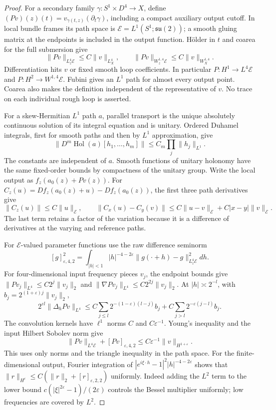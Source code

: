 \documentclass[11pt]{amsart}
\theoremstyle{definition}
\theoremstyle{remark}
\theoremstyle{plain}
\begin{document}
\begin{proof}
For a secondary family $\gamma:S^1\times D^4\to X$, define
$(Pv)(z)(t)=v_{\gamma(t,z)}(\partial_t\gamma)$, including a
compact auxiliary output cutoff. In local bundle frames its path space
is $\mathcal E=L^1(S^1;\mathfrak{su}(2))$; a smooth gluing
matrix at the endpoints is included in the output function.
H\"older in $t$ and coarea for the full submersion give
\[
       \|Pv\|_{L_z^4\mathcal E}\leq C\|v\|_{L_X^4},\qquad
       \|Pv\|_{W_z^{1,4}\mathcal E}\leq C\|v\|_{W_X^{1,4}}.
\]
Differentiation hits $v$ or fixed smooth loop coefficients. In
particular $P:H^1\to L^4\mathcal E$ and
$P:H^2\to W^{1,4}\mathcal E$. Fubini gives an $L^1$ path
for almost every output point. Coarea also makes the definition
independent of the representative of $v$. No trace on each individual
rough loop is asserted.

For a skew-Hermitian $L^1$ path $a$, parallel transport is the
unique absolutely continuous solution of its integral equation and
is unitary. Ordered Duhamel integrals, first for smooth paths and
then by $L^1$ approximation, give
\[
 \|D^m\operatorname{Hol}(a)[h_1,\ldots,h_m]\|
                                      \leq C_m\prod_j\|h_j\|_{L^1}.
\]
The constants are independent of $a$. Smooth functions of unitary
holonomy have the same fixed-order bounds by compactness of the
unitary group. Write the local output as $f_z(a_0(z)+Pv(z))$.
For $C_z(u)=Df_z(a_0(z)+u)-Df_z(a_0(z))$, the first three
path derivatives give
\[
 \|C_z(u)\|\leq C\|u\|_{\mathcal E},\qquad
 \|C_x(u)-C_y(v)\|\leq C\|u-v\|_{\mathcal E}
                                      +C|x-y|\|v\|_{\mathcal E}.
\]
The last term retains a factor of the variation because it is a
difference of derivatives at the varying and reference paths.

For $\mathcal E$-valued parameter functions use the raw difference
seminorm
\[
 [g]_{\varepsilon,4,2}^2
       =\int_{|h|<1}|h|^{-4-2\varepsilon}\|g(\cdot+h)-g\|_{L_z^4\mathcal E}^2dh.
\]
For four-dimensional input frequency pieces $v_j$, the endpoint
bounds give $\|Pv_j\|_{L^4}\leq C2^j\|v_j\|_2$ and
$\|\nabla Pv_j\|_{L^4}\leq C2^{2j}\|v_j\|_2$.
At $|h|\asymp2^{-l}$, with $b_j=2^{(1+\varepsilon)j}\|v_j\|_2$,
\[
 2^{\varepsilon l}\|\Delta_hPv\|_{L^4}
 \leq C\sum_{j\leq l}2^{-(1-\varepsilon)(l-j)}b_j
                   +C\sum_{j>l}2^{-\varepsilon(j-l)}b_j.
\]
The convolution kernels have $\ell^1$ norms $C$ and
$C\varepsilon^{-1}$. Young's inequality and the input Hilbert
Sobolev norm give
\[
       \|Pv\|_{L^4\mathcal E}+[Pv]_{\varepsilon,4,2}
                              \leq C\varepsilon^{-1}\|v\|_{H^{1+\varepsilon}}.
\]
This uses only norms and the triangle inequality in the path space.
For the finite-dimensional output, Fourier integration of
$|e^{i\xi\cdot h}-1|^2|h|^{-4-2\varepsilon}$ shows that
$\|r\|_{H^\varepsilon}\leq C(\|r\|_2+[r]_{\varepsilon,2,2})$
uniformly. Indeed adding the $L^2$ term to the lower bound
$c(|\xi|^{2\varepsilon}-1)/(2\varepsilon)$ controls the
Bessel multiplier uniformly; low frequencies are covered by $L^2$.


\end{proof}
\end{document}
